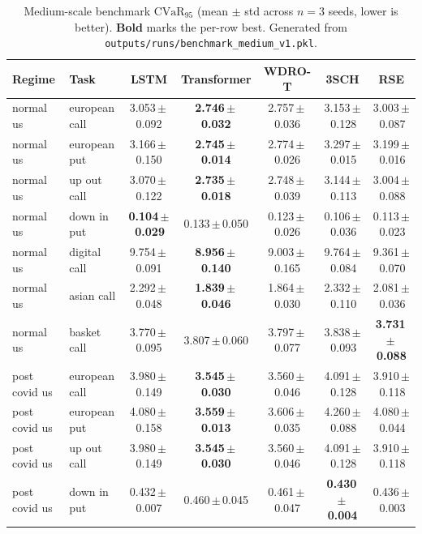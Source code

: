 \documentclass[11pt,oneside]{report}
\newcommand{\cvar}{\mathrm{CVaR}}
\begin{document}
\begin{table}[H]\centering\scriptsize
\caption{Medium-scale benchmark $\cvar_{95}$ (mean $\pm$ std across $n=3$ seeds, lower is better).  \textbf{Bold} marks the per-row best.  Generated from \texttt{outputs/runs/benchmark\_medium\_v1.pkl}.}
\label{tab:medium_results}
\begin{tabular}{llccccc}
\toprule
Regime & Task & LSTM & Transformer & WDRO-T & 3SCH & RSE \\
\midrule
normal us & european call & 3.053\,$\pm$\,0.092 & \textbf{2.746\,$\pm$\,0.032} & 2.757\,$\pm$\,0.036 & 3.153\,$\pm$\,0.128 & 3.003\,$\pm$\,0.087 \\
normal us & european put & 3.166\,$\pm$\,0.150 & \textbf{2.745\,$\pm$\,0.014} & 2.774\,$\pm$\,0.026 & 3.297\,$\pm$\,0.015 & 3.199\,$\pm$\,0.016 \\
normal us & up out call & 3.070\,$\pm$\,0.122 & \textbf{2.735\,$\pm$\,0.018} & 2.748\,$\pm$\,0.039 & 3.144\,$\pm$\,0.113 & 3.004\,$\pm$\,0.088 \\
normal us & down in put & \textbf{0.104\,$\pm$\,0.029} & 0.133\,$\pm$\,0.050 & 0.123\,$\pm$\,0.026 & 0.106\,$\pm$\,0.036 & 0.113\,$\pm$\,0.023 \\
normal us & digital call & 9.754\,$\pm$\,0.091 & \textbf{8.956\,$\pm$\,0.140} & 9.003\,$\pm$\,0.165 & 9.764\,$\pm$\,0.084 & 9.361\,$\pm$\,0.070 \\
normal us & asian call & 2.292\,$\pm$\,0.048 & \textbf{1.839\,$\pm$\,0.046} & 1.864\,$\pm$\,0.030 & 2.332\,$\pm$\,0.110 & 2.081\,$\pm$\,0.036 \\
normal us & basket call & 3.770\,$\pm$\,0.095 & 3.807\,$\pm$\,0.060 & 3.797\,$\pm$\,0.077 & 3.838\,$\pm$\,0.093 & \textbf{3.731\,$\pm$\,0.088} \\
\midrule
post covid us & european call & 3.980\,$\pm$\,0.149 & \textbf{3.545\,$\pm$\,0.030} & 3.560\,$\pm$\,0.046 & 4.091\,$\pm$\,0.128 & 3.910\,$\pm$\,0.118 \\
post covid us & european put & 4.080\,$\pm$\,0.158 & \textbf{3.559\,$\pm$\,0.013} & 3.606\,$\pm$\,0.035 & 4.260\,$\pm$\,0.088 & 4.080\,$\pm$\,0.044 \\
post covid us & up out call & 3.980\,$\pm$\,0.149 & \textbf{3.545\,$\pm$\,0.030} & 3.560\,$\pm$\,0.046 & 4.091\,$\pm$\,0.128 & 3.910\,$\pm$\,0.118 \\
post covid us & down in put & 0.432\,$\pm$\,0.007 & 0.460\,$\pm$\,0.045 & 0.461\,$\pm$\,0.047 & \textbf{0.430\,$\pm$\,0.004} & 0.436\,$\pm$\,0.003 \\

\end{tabular}
\end{table}
\end{document}
